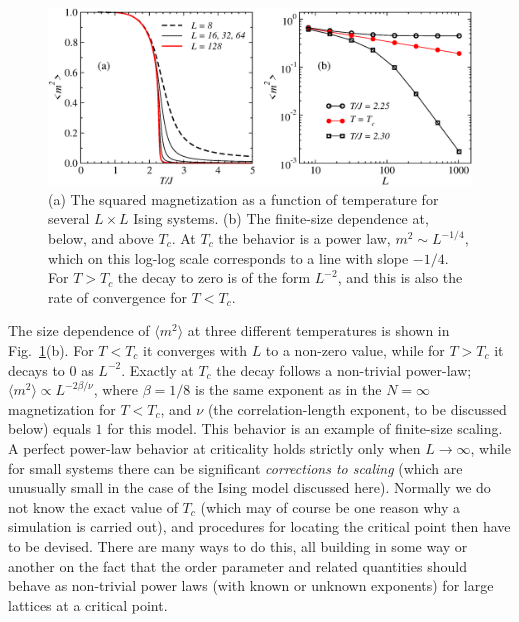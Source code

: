 \documentclass[draft,numberedheadings]{aipproc}
\begin{document}
\begin{figure}
\includegraphics[width=12cm, clip]{ismag2.eps}
\caption{(a) The squared magnetization as a function of temperature for several $L\times L$ Ising systems. (b) The finite-size dependence at, below, 
and above $T_c$. At $T_c$ the behavior is a power law, $m^2 \sim L^{-1/4}$, which on this log-log scale corresponds to a line with slope $-1/4$. For
$T>T_c$ the decay to zero is of the form $L^{-2}$, and this is also the rate of convergence for $T<T_c$.}
\label{ismag2}
\end{figure}

The size dependence of $\langle m^2\rangle$ at three different temperatures is shown in Fig.~\ref{ismag2}(b). For $T < T_c$ it converges with 
$L$ to a non-zero value, while for $T>T_c$ it decays to $0$ as $L^{-2}$. Exactly at $T_c$ the decay follows a non-trivial power-law; 
$\langle m^2\rangle \propto L^{-2\beta/\nu}$, where $\beta=1/8$ is the same exponent as in the $N=\infty$ magnetization for $T<T_c$, and $\nu$ (the 
correlation-length exponent, to be discussed below) equals $1$ for this model. This behavior is an example of finite-size scaling. A perfect power-law 
behavior at criticality holds strictly only when $L\to \infty$, while for small systems there can be significant 
{\it corrections to scaling} (which are 
unusually small in the case of the Ising model discussed here). Normally we do not know the exact value of $T_c$ (which may of course be one reason why a 
simulation is carried out), and procedures for locating the critical point then have to be devised. There are many ways to do this, all building in some 
way or another on the fact that the order parameter and related quantities should behave as non-trivial power laws (with known or unknown exponents) 
for large lattices at a critical point.
\end{document}
